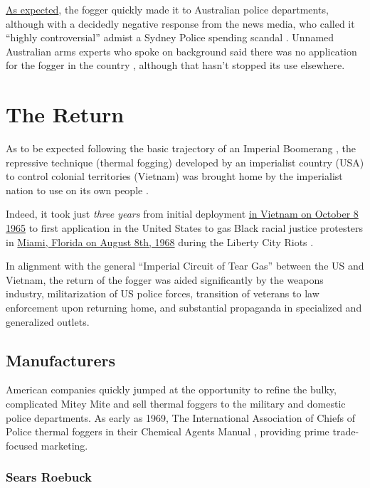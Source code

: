 \documentclass[
  11pt,
]{krantz}
\begin{document}
\protect\hyperlink{TheReturn}{As expected}, the fogger quickly made it to Australian police departments, although with a decidedly negative response from the news media, who called it ``highly controversial'' admist a Sydney Police spending scandal \citep{Allen1972}.
Unnamed Australian arms experts who spoke on background said there was no application for the fogger in the country \citep{Allen1972}, although that hasn't stopped its use elsewhere.

\hypertarget{TheReturn}{%
\chapter*{The Return}\label{TheReturn}}


As to be expected following the basic trajectory of an Imperial Boomerang \citep{Cesaire1950, Arendt1951, Foucault1976}, the repressive technique (thermal fogging) developed by an imperialist country (USA) to control colonial territories (Vietnam) was brought home by the imperialist nation to use on its own people \citep{Graham2013}.

Indeed, it took just \emph{three years} from initial deployment \protect\hyperlink{FirstUse}{in Vietnam on October 8 1965} to first application in the United States to gas Black racial justice protesters in \protect\hyperlink{MiamiFL1968_08_08}{Miami, Florida on August 8th, 1968} during the Liberty City Riots \citep{Tschenschlok1995, Lorentzen2018}.

In alignment with the general ``Imperial Circuit of Tear Gas'' \citep{Schrader2019} between the US and Vietnam, the return of the fogger was aided significantly by the weapons industry, militarization of US police forces, transition of veterans to law enforcement upon returning home, and substantial propaganda in specialized and generalized outlets.

\hypertarget{manufacturers}{%
\section*{Manufacturers}\label{manufacturers}}


American companies quickly jumped at the opportunity to refine the bulky, complicated Mitey Mite and sell thermal foggers to the military and domestic police departments.
As early as 1969, The International Association of Chiefs of Police thermal foggers in their Chemical Agents Manual \citep{Crockett1969}, providing prime trade-focused marketing.

\hypertarget{sears-roebuck}{%
\subsection*{Sears Roebuck}\label{sears-roebuck}}
\end{document}
